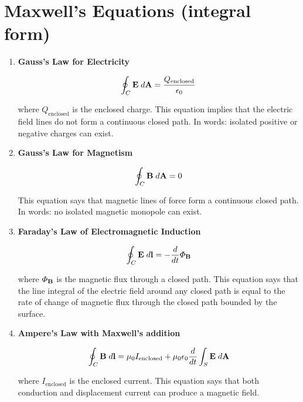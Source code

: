 \documentclass{article}
\theoremstyle{definition}
\begin{document}
\smallskip
\section{Maxwell's Equations (integral form)}
\label{sec:maxwells_equations_integral_form}

\begin{enumerate}
\item {\bf Gauss's Law for Electricity}

\begin{equation*}
\oint_{C} \mathbf{E} \;  d\mathbf{A}= \dfrac{Q_{\text{enclosed}}}{\epsilon_0}
\end{equation*}

\medskip
\noindent
where $Q_{\text{enclosed}}$ is the enclosed charge. This equation
implies that the electric field lines do not form a continuous
closed path. In words: isolated positive or negative charges can 
exist.


\bigskip
\item {\bf Gauss's Law for Magnetism}

\begin{equation*}
\oint_{C} \mathbf{B} \;  d\mathbf{A} = 0
\end{equation*}

\medskip
\noindent
This equation says that magnetic lines of force form a
continuous closed path. In words: no isolated magnetic 
monopole can exist.


\bigskip
\item {\bf Faraday's Law of Electromagnetic Induction}

\begin{equation*}
\oint_{C} \mathbf{E} \; d\mathbf{l} = -\dfrac{d}{dt} \Phi_{\mathbf{B}}
\end{equation*}

\medskip
\noindent
where $\Phi_{\mathbf{B}}$ is the magnetic flux through a closed path.
This equation says that the line integral of the electric field
around any closed path is equal to the rate of change of magnetic
flux through the closed path bounded by the surface.

\bigskip
\item {\bf Ampere's Law with Maxwell's addition}

\begin{equation*}
\oint_{C} \mathbf{B} \; d\mathbf{l} = \mu_0 I_{\text{enclosed}} + 
\mu_0\epsilon_0 \dfrac{d}{dt} \int_{S} \mathbf{E} \;  d\mathbf{A}
\end{equation*}


\medskip
\noindent
where $I_{\text{enclosed}}$ is the enclosed current.  This
equation says that both conduction and displacement
current can produce a magnetic field.
\end{enumerate}
\end{document}
